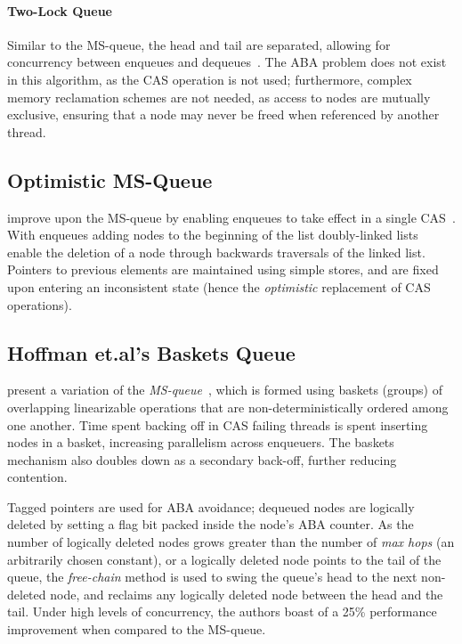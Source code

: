 \paragraph{Two-Lock Queue}
Similar to the MS-queue, the head and tail are separated, allowing for
concurrency between enqueues and dequeues~\citep{michael1996simple}. The ABA
problem does not exist in this algorithm, as the CAS operation is not used;
furthermore, complex memory reclamation schemes are not needed, as access to
nodes are mutually exclusive, ensuring that a node may never be freed when
referenced by another thread.

\subsection{Optimistic MS-Queue}
\citeauthor{ladan2008optimistic} improve upon the MS-queue by enabling enqueues
to take effect in a single CAS~\citep{ladan2008optimistic}.
With enqueues adding nodes to the beginning of the list\textemdash
doubly-linked lists enable the deletion of a node through backwards
traversals of the linked list.
Pointers to previous elements are maintained using simple stores, and are fixed
upon entering an inconsistent state (hence the \emph{optimistic} replacement of
CAS operations).

\subsection{Hoffman et.al's Baskets Queue}
\citeauthor{hoffman2007baskets} present a variation of the
\emph{MS-queue}~\citep{hoffman2007baskets}, which is formed using baskets
(groups) of overlapping linearizable operations that are non-deterministically
ordered among one another.
Time spent backing off in CAS failing threads is
spent inserting nodes in a basket, increasing parallelism across enqueuers.
The baskets mechanism also doubles down as a secondary back-off, further reducing contention.

Tagged pointers are used for ABA avoidance; dequeued nodes are logically
deleted by setting a flag bit packed inside the node's ABA counter. As the
number of logically deleted nodes grows greater than the number of \emph{max
hops} (an arbitrarily chosen constant), or a logically deleted node points to
the tail of the queue, the \emph{free-chain} method is used to swing the
queue's head to the next non-deleted node, and reclaims any logically deleted
node between the head and the tail. Under high levels of concurrency, the
authors boast of a 25\% performance improvement when compared to the MS-queue.

